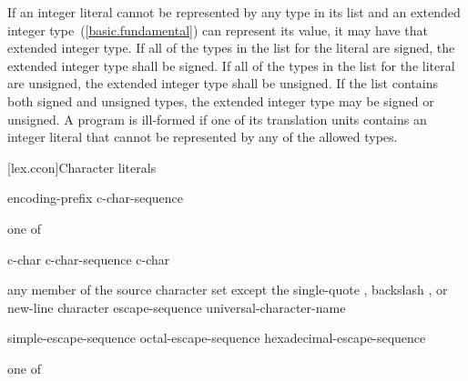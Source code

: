 \pnum
If an integer literal cannot be represented by any type in its list and
an extended integer type~(\ref{basic.fundamental}) can represent its value, it may have that
extended integer type. If all of the types in the list for the literal
are signed, the extended integer type shall be signed. If all of the
types in the list for the literal are unsigned, the extended integer
type shall be unsigned. If the list contains both signed and unsigned
types, the extended integer type may be signed or unsigned. A program is
ill-formed if one of its translation units contains an integer literal
that cannot be represented by any of the allowed types.

[lex.ccon]{Character literals}

%
\begin{bnf}
\br
    encoding-prefix\opt{}  c-char-sequence 
\end{bnf}

\begin{bnf}
 \textnormal{one of}\br
    \quad{}\quad{}\quad{}
\end{bnf}

\begin{bnf}
\br
    c-char\br
    c-char-sequence c-char
\end{bnf}

\begin{bnftab}
\br
\>\textnormal{any member of the source character set except}\br
\>\>\textnormal{the single-quote , backslash \terminal{\textbackslash}, or new-line character}\br
\>escape-sequence\br
\>universal-character-name
\end{bnftab}

\begin{bnf}
\br
    simple-escape-sequence\br
    octal-escape-sequence\br
    hexadecimal-escape-sequence
\end{bnf}

\begin{bnf}
 \textnormal{one of}\br
    \quad{}\quad{}\quad\terminal{\textbackslash\textbackslash}\br
    \quad{}\quad{}\quad{}\quad{}\quad{}\quad{}
\end{bnf}

